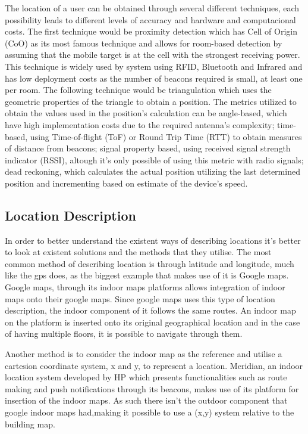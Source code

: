 \documentclass[a4paper]{IEEEtran}
\begin{document}
The location of a user can be obtained through several different techniques, each possibility leads to different levels of accuracy and hardware and computacional costs.
The first technique would be proximity detection which has Cell of Origin (CoO) as its most famous technique and allows for room-based detection by assuming that the mobile target is at the cell with the strongest receiving power. This technique is widely used by system using RFID, Bluetooth and Infrared and has low deployment costs as the number of beacons required is small, at least one per room. 
The following technique would be triangulation which uses the geometric properties of the triangle to obtain a position. The metrics utilized to obtain the values used in the position's calculation can be angle-based, which have high implementation costs due to the required antenna's complexity; time-based, using Time-of-flight (ToF) or Round Trip Time (RTT) to obtain measures of distance from beacons; signal property based, using received signal strength indicator (RSSI), altough it's only possible of using this metric with radio signals; dead reckoning, which calculates the actual position utilizing the last determined position and incrementing based on estimate of the device's speed.

\subsection{Location Description}
\label{subsec:description}

In order to better understand the existent ways of describing locations it's better to look at existent solutions and the methods that they utilise. The most common method of describing location is through latitude and longitude, much like the gps does, as the biggest example that makes use of it is Google maps. Google maps, through its indoor maps platforms \cite{googlemaps} allows integration of indoor maps onto their google maps. Since google maps uses this type of location description, the indoor component of it follows the same routes. An indoor map on the platform is inserted onto its original geographical location and in the case of having multiple floors, it is possible to navigate through them.

Another method is to consider the indoor map as the reference and utilise a cartesion coordinate system, x and y, to represent a location. Meridian, an indoor location system developed by HP \cite{meridian} which presents functionalities such as route making and push notifications through its beacons, makes use of its platform for insertion of the indoor maps. As such there isn't the outdoor component that google indoor maps had,making it possible to use a (x,y) system relative to the building map.
\end{document}
